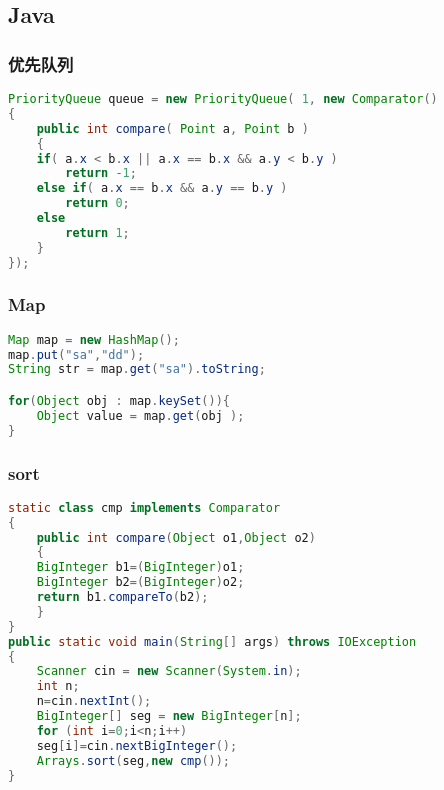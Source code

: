 \subsection{Java}
    \subsubsection{优先队列}
	\begin{lstlisting}[language=java]
PriorityQueue queue = new PriorityQueue( 1, new Comparator()
{
    public int compare( Point a, Point b )
    {
	if( a.x < b.x || a.x == b.x && a.y < b.y )
	    return -1;
	else if( a.x == b.x && a.y == b.y )
	    return 0;
	else
	    return 1;
    }
});
	\end{lstlisting}
    \subsubsection{Map}
	\begin{lstlisting}[language=java]
Map map = new HashMap();
map.put("sa","dd");
String str = map.get("sa").toString;

for(Object obj : map.keySet()){
    Object value = map.get(obj );
}
	\end{lstlisting}
    \subsubsection{sort}
	\begin{lstlisting}[language=java]
static class cmp implements Comparator
{
    public int compare(Object o1,Object o2)
    {
	BigInteger b1=(BigInteger)o1;
	BigInteger b2=(BigInteger)o2;
	return b1.compareTo(b2);
    }
}
public static void main(String[] args) throws IOException
{
    Scanner cin = new Scanner(System.in);
    int n;
    n=cin.nextInt();
    BigInteger[] seg = new BigInteger[n];
    for (int i=0;i<n;i++)
	seg[i]=cin.nextBigInteger();
    Arrays.sort(seg,new cmp());
}
	\end{lstlisting}
